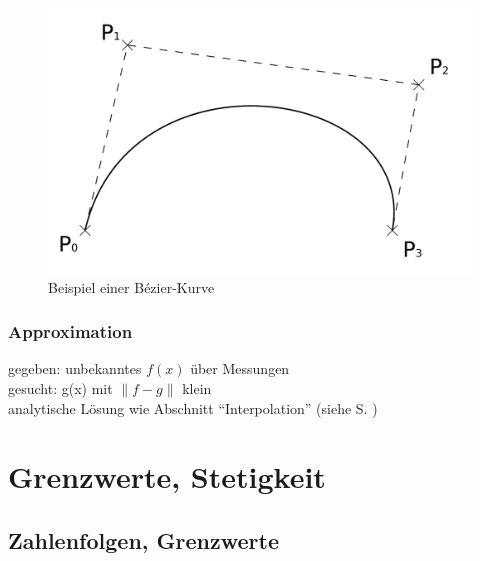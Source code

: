 \begin{figure}[htp]
  \centering
  \includegraphics[width=.5\textwidth]{include/Bezier_curve.pdf}
  \caption{Beispiel einer Bézier-Kurve \cite{src:fig:bezier_ex}}
  \label{fig:bezier_ex}
\end{figure}


\subsubsection*{Approximation}
gegeben: unbekanntes $f(x)$ über Messungen \\
gesucht: g(x) mit $\left\| f - g \right\|$ klein \\
analytische Lösung wie Abschnitt "`Interpolation"' (siehe S. \pageref{interpolation})

\section{Grenzwerte, Stetigkeit}

\subsection{Zahlenfolgen, Grenzwerte}

